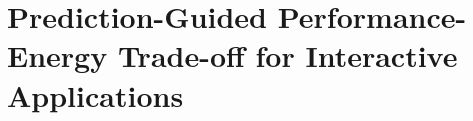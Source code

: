 \chapter{Prediction-Guided Performance-Energy Trade-off for Interactive Applications}
\label{chap:exec_time_prediction}






